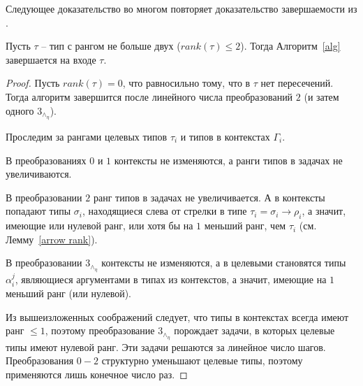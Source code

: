 \documentclass{spbau-diploma}
\begin{document}
Следующее доказательство во многом повторяет доказательство завершаемости из \cite{kusmierek_07}.
\begin{theorem}[Termination]
Пусть $\tau$ -- тип с рангом не больше двух ($rank(\tau) \leqslant 2$). Тогда Алгоритм~\ref{alg} завершается на входе $\tau$.
\end{theorem}
\begin{proof}
    Пусть $rank(\tau) = 0$, что равносильно тому, что в $\tau$ нет пересечений. Тогда алгоритм завершится после линейного числа преобразований $2$ (и затем одного $3_\wedge_\eta$).
    
    Проследим за рангами целевых типов $\tau_i$ и типов в контекстах $\Gamma_i$.
    
    В преобразованиях $0$ и $1$ контексты не изменяются, а ранги типов в задачах не увеличиваются.
    
    В преобразовании $2$ ранг типов в задачах не увеличивается. А в контексты попадают 
    типы $\sigma_i$, находящиеся слева от стрелки в типе $\tau_i = \sigma_i \to \rho_i$, а значит, имеющие или нулевой ранг, или хотя бы на $1$ меньший ранг, чем $\tau_i$ (см. Лемму~\ref{arrow rank}). 
    
    В преобразовании $3_\wedge_\eta$ контексты не изменяются, а в целевыми становятся типы $\alpha_i^j$, являющиеся аргументами в типах из контекстов, а значит, имеющие на $1$ меньший ранг (или нулевой).
    
    Из вышеизложенных соображений следует, что типы в контекстах всегда имеют ранг $\leqslant 1$, поэтому преобразование $3_\wedge_\eta$ порождает задачи, в которых целевые типы имеют нулевой ранг. Эти задачи решаются за линейное число шагов. 
    Преобразования $0-2$ структурно уменьшают целевые типы, поэтому применяются лишь конечное число раз.
    
\end{proof}


\end{document}
